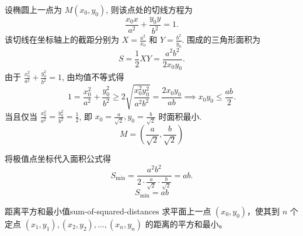 \begin{solution}
    设椭圆上一点为 $M(x_0, y_0)$, 则该点处的切线方程为
    \begin{equation}
        \frac{x_0 x}{a^2} + \frac{y_0 y}{b^2} = 1 .
    \end{equation}
    该切线在坐标轴上的截距分别为 $X = \frac{a^2}{x_0}$ 和 $Y = \frac{b^2}{y_0}$. 围成的三角形面积为
    \begin{equation}
        S = \frac{1}{2} XY = \frac{a^2 b^2}{2 x_0 y_0} .
    \end{equation}
    由于 $\frac{x_0^2}{a^2} + \frac{y_0^2}{b^2} = 1$, 由均值不等式得
    \begin{equation}
        1 = \frac{x_0^2}{a^2} + \frac{y_0^2}{b^2} \ge 2 \sqrt{\frac{x_0^2 y_0^2}{a^2 b^2}} = \frac{2 x_0 y_0}{ab} \implies x_0 y_0 \le \frac{ab}{2} .
    \end{equation}
    当且仅当 $\frac{x_0^2}{a^2} = \frac{y_0^2}{b^2} = \frac{1}{2}$, 即 $x_0 = \frac{a}{\sqrt{2}}, y_0 = \frac{b}{\sqrt{2}}$ 时面积最小.
    \begin{equation}
        \boxed{M = \left( \frac{a}{\sqrt{2}}, \frac{b}{\sqrt{2}} \right)}
    \end{equation}

    将极值点坐标代入面积公式得
    \begin{equation}
        S_{\min} = \frac{a^2 b^2}{2 \cdot \frac{a}{\sqrt{2}} \cdot \frac{b}{\sqrt{2}}} = ab .
    \end{equation}
    \begin{equation}
        \boxed{S_{\min} = ab}
    \end{equation}
\end{solution}


\begin{problem}{距离平方和最小值}{sum-of-squared-distances}
    求平面上一点 $(x_0, y_0)$，使其到 $n$ 个定点 $(x_1, y_1), (x_2, y_2), \dots, (x_n, y_n)$ 的距离的平方和最小。
\end{problem}

